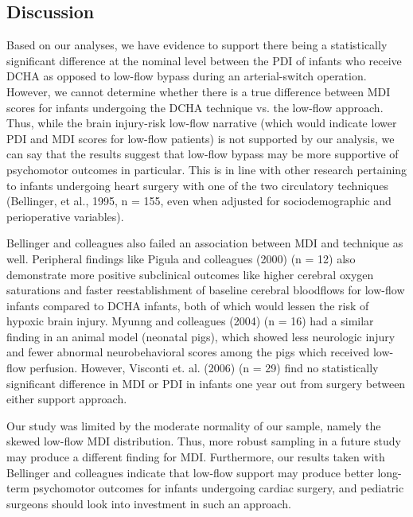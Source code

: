 \documentclass{article}
\begin{document}
\begin{enumerate}
		\subsection*{Discussion}
		Based on our analyses, we have evidence to support there being a statistically significant difference at the nominal level between the PDI of infants who receive DCHA as opposed to low-flow bypass during an arterial-switch operation. However, we cannot determine whether there is a true difference between MDI scores for infants undergoing the DCHA technique vs. the low-flow approach. Thus, while the brain injury-risk low-flow narrative (which would indicate lower PDI and MDI scores for low-flow patients) is not supported by our analysis, we can say that the results suggest that low-flow bypass may be more supportive of psychomotor outcomes in particular. This is in line with other research pertaining to infants undergoing heart surgery with one of the two circulatory techniques (Bellinger, et al., 1995, n = 155, even when adjusted for sociodemographic and perioperative variables).

		Bellinger and colleagues also failed an association between MDI and technique as well. Peripheral findings like Pigula and colleagues (2000) (n = 12) also demonstrate more positive subclinical outcomes like higher cerebral oxygen saturations and faster reestablishment of baseline cerebral bloodflows for low-flow infants compared to DCHA infants, both of which would lessen the risk of hypoxic brain injury. Myunng and colleagues (2004) (n = 16) had a similar finding in an animal model (neonatal pigs), which showed less neurologic injury and fewer abnormal neurobehavioral scores among the pigs which received low-flow perfusion. However, Visconti et. al. (2006) (n = 29) find no statistically significant difference in MDI or PDI in infants one year out from surgery between either support approach. 
		
		Our study was limited by the moderate normality of our sample, namely the skewed low-flow MDI distribution. Thus, more robust sampling in a future study may produce a different finding for MDI. Furthermore, our results taken with Bellinger and colleagues indicate that low-flow support may produce better long-term psychomotor outcomes for infants undergoing cardiac surgery, and pediatric surgeons should look into investment in such an approach.
		

			
			
			
			
			
			
			
		
	\end{enumerate}
		
\end{document}
